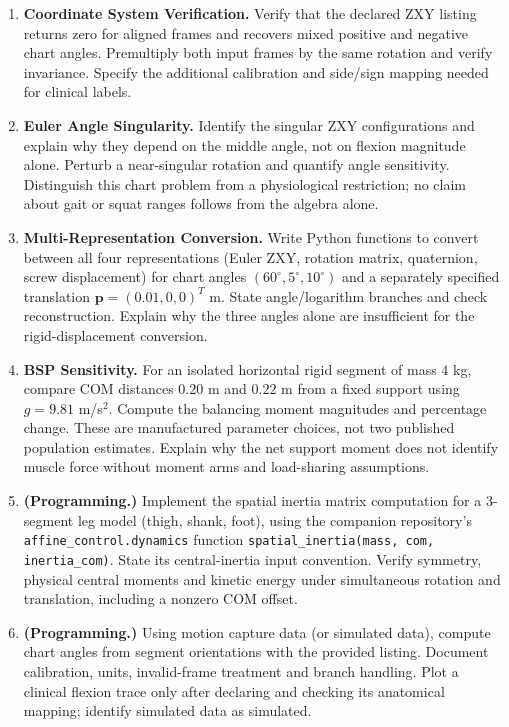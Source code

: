 \begin{enumerate}
  \item \textbf{Coordinate System Verification.}
        Verify that the declared ZXY listing returns zero for aligned frames
        and recovers mixed positive and negative chart angles. Premultiply both
        input frames by the same rotation and verify invariance. Specify the
        additional calibration and side/sign mapping needed for clinical labels.

  \item \textbf{Euler Angle Singularity.}
        Identify the singular ZXY configurations and explain why they depend
        on the middle angle, not on flexion magnitude alone. Perturb a near-singular
        rotation and quantify angle sensitivity. Distinguish this chart problem
        from a physiological restriction; no claim about gait or squat ranges
        follows from the algebra alone.

  \item \textbf{Multi-Representation Conversion.}
        Write Python functions to convert between all four representations
        (Euler ZXY, rotation matrix, quaternion, screw displacement) for chart
        angles $(60^\circ,5^\circ,10^\circ)$ and a separately specified
        translation $\bm{p}=(0.01,0,0)^T$ m. State angle/logarithm branches and
        check reconstruction. Explain why the three angles alone are insufficient
        for the rigid-displacement conversion.

  \item \textbf{BSP Sensitivity.}
        For an isolated horizontal rigid segment of mass $4$ kg, compare COM
        distances $0.20$ m and $0.22$ m from a fixed support using $g=9.81$
        m/s$^2$. Compute the balancing moment magnitudes and percentage change.
        These are manufactured parameter choices, not two published population
        estimates. Explain why the net support moment does not identify muscle
        force without moment arms and load-sharing assumptions.

  \item \textbf{(Programming.)} Implement the spatial inertia matrix computation
        for a 3-segment leg model (thigh, shank, foot), using the companion
        repository's \texttt{affine\_control.}\allowbreak\texttt{dynamics} function
        \texttt{spatial\_inertia(mass, com, inertia\_com)}.
        State its central-inertia input convention. Verify symmetry, physical
        central moments and kinetic energy under simultaneous rotation and
        translation, including a nonzero COM offset.

  \item \textbf{(Programming.)} Using motion capture data (or simulated data),
        compute chart angles from segment orientations with the provided listing.
        Document calibration, units, invalid-frame treatment and branch handling.
        Plot a clinical flexion trace only after declaring and checking its
        anatomical mapping; identify simulated data as simulated.
\end{enumerate}
